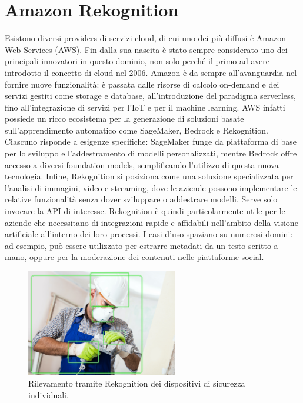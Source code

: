 \section{Amazon Rekognition}

\noindent Esistono diversi providers di servizi cloud, di cui uno dei più diffusi è Amazon Web Services (AWS). Fin dalla sua nascita è stato sempre considerato uno dei principali innovatori in questo dominio, non solo perché il primo ad avere introdotto il concetto di cloud nel 2006. Amazon è da sempre all'avanguardia nel fornire nuove funzionalità: è passata dalle risorse di calcolo on-demand e dei servizi gestiti come storage e database, all'introduzione del paradigma serverless, fino all'integrazione di servizi per l'IoT e per il machine learning. AWS infatti possiede un ricco ecosistema per la generazione di soluzioni basate sull'apprendimento automatico come SageMaker, Bedrock e Rekognition. Ciascuno risponde a esigenze specifiche: SageMaker funge da piattaforma di base per lo sviluppo e l'addestramento di modelli personalizzati, mentre Bedrock offre accesso a diversi foundation models, semplificando l'utilizzo di questa nuova tecnologia. Infine, Rekognition si posiziona come una soluzione specializzata per l’analisi di immagini, video e streaming, dove le aziende possono implementare le relative funzionalità senza dover sviluppare o addestrare modelli. Serve solo invocare la API di interesse. Rekognition è quindi particolarmente utile per le aziende che necessitano di integrazioni rapide e affidabili nell'ambito della visione artificiale all'interno dei loro processi. I casi d'uso spaziano su numerosi domini: ad esempio, può essere utilizzato per estrarre metadati da un testo scritto a mano, oppure per la moderazione dei contenuti nelle piattaforme social.

\begin{figure}[htbp]
    \centering
    \includegraphics[width=0.59\textwidth]{figures/worker-with-bb.png}
    \caption{Rilevamento tramite Rekognition dei dispositivi di sicurezza individuali.}
    \label{fig:ppe-example}
\end{figure}


